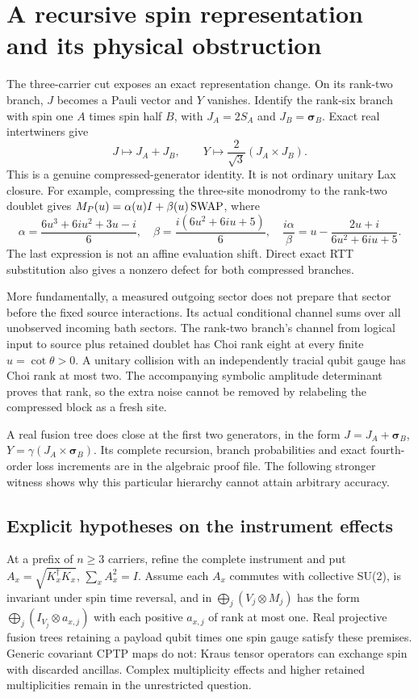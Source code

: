 \section{A recursive spin representation and its physical obstruction}
The three-carrier cut exposes an exact representation change. On its
rank-two branch, $J$ becomes a Pauli vector and $Y$ vanishes. Identify the
rank-six branch with spin one $A$ times spin half $B$, with
$J_A=2S_A$ and $J_B=\boldsymbol\sigma_B$. Exact real intertwiners give
\[
 J\mapsto J_A+J_B,\qquad
 Y\mapsto\frac2{\sqrt3}(J_A\times J_B).
\]
This is a genuine compressed-generator identity. It is not ordinary
unitary Lax closure. For example, compressing the three-site monodromy
to the rank-two doublet gives $M_P(u)=\alpha(u)I+\beta(u)\operatorname{SWAP}$, where
\[
 \alpha=\frac{6u^3+6iu^2+3u-i}{6},\quad
 \beta=\frac{i(6u^2+6iu+5)}6,\quad
 \frac{i\alpha}{\beta}=u-\frac{2u+i}{6u^2+6iu+5}.
\]
The last expression is not an affine evaluation shift. Direct exact RTT
substitution also gives a nonzero defect for both compressed branches.

More fundamentally, a measured outgoing sector does not prepare that sector
before the fixed source interactions. Its actual conditional channel sums
over all unobserved incoming bath sectors. The rank-two branch's channel
from logical input to source plus retained doublet has Choi rank eight at
every finite $u=\cot\theta>0$. A unitary collision with an independently
tracial qubit gauge has Choi rank at most two. The accompanying symbolic
amplitude determinant proves that rank, so the extra noise cannot be removed
by relabeling the compressed block as a fresh site.

A real fusion tree does close at the first two generators, in the form
$J=J_A+\boldsymbol\sigma_B$, $Y=\gamma(J_A\times\boldsymbol\sigma_B)$.
Its complete recursion, branch probabilities and exact fourth-order loss
increments are in the algebraic proof file. The following stronger witness
shows why this particular hierarchy cannot attain arbitrary accuracy.

\subsection{Explicit hypotheses on the instrument effects}
At a prefix of $n\ge3$ carriers, refine the complete instrument and put
$A_x=\sqrt{K_x^\dagger K_x}$, $\sum_xA_x^2=I$. Assume each $A_x$ commutes
with collective SU(2), is invariant under spin time reversal, and in
$\bigoplus_j(V_j\otimes M_j)$ has the form $\bigoplus_j(I_{V_j}\otimes a_{x,j})$
with each positive $a_{x,j}$ of rank at most one. Real projective fusion
trees retaining a payload qubit times one spin gauge satisfy these premises.
Generic covariant CPTP maps do not: Kraus tensor operators can exchange
spin with discarded ancillas. Complex multiplicity effects and higher
retained multiplicities remain in the unrestricted question.

